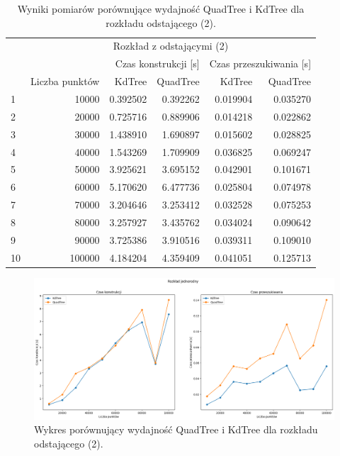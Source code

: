 \documentclass{lab}
\begin{document}
\begin{table}[H]
\centering
\begin{tabular}{lrrrrr}
  \toprule
   & \multicolumn{5}{c}{Rozkład z odstającymi (2)} \\
   &  & \multicolumn{2}{r}{Czas konstrukcji [s]} & \multicolumn{2}{r}{Czas przeszukiwania [s]} \\
   & Liczba punktów & KdTree & QuadTree & KdTree & QuadTree \\
  \midrule
1 & 10000 & 0.392502 & 0.392262 & 0.019904 & 0.035270 \\
2 & 20000 & 0.725716 & 0.889906 & 0.014218 & 0.022862 \\
3 & 30000 & 1.438910 & 1.690897 & 0.015602 & 0.028825 \\
4 & 40000 & 1.543269 & 1.709909 & 0.036825 & 0.069247 \\
5 & 50000 & 3.925621 & 3.695152 & 0.042901 & 0.101671 \\
6 & 60000 & 5.170620 & 6.477736 & 0.025804 & 0.074978 \\
7 & 70000 & 3.204646 & 3.253412 & 0.032528 & 0.075253 \\
8 & 80000 & 3.257927 & 3.435762 & 0.034024 & 0.090642 \\
9 & 90000 & 3.725386 & 3.910516 & 0.039311 & 0.109010 \\
10 & 100000 & 4.184204 & 4.359409 & 0.041051 & 0.125713 \\
  \bottomrule
  \end{tabular}
\caption{Wyniki pomiarów porównujące wydajność QuadTree i KdTree dla rozkładu odstającego (2).}
\label{tab:outlier_time_2}
\end{table}  

\begin{figure}[H]
  \centering
  \includegraphics[width=1\textwidth]{resources/outlier_graph_2.png}
  \caption{Wykres porównujący wydajność QuadTree i KdTree dla rozkładu odstającego (2).}
  \label{fig:outlier_graph_2}
\end{figure}
\end{document}
